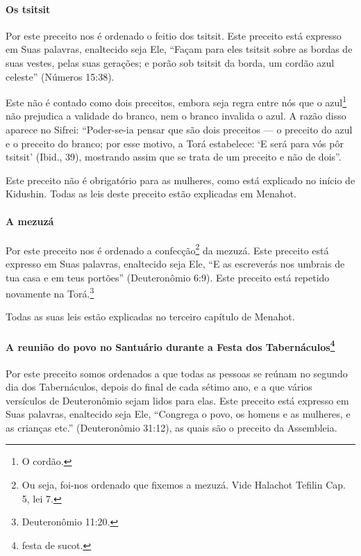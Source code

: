 \paragraph{Os tsitsit}

Por este preceito nos é ordenado o feitio dos tsitsit. Este
preceito está expresso em Suas palavras, enaltecido seja Ele, ``Façam
para eles tsitsit sobre as bordas de suas vestes, pelas suas gerações;
e porão sob tsitsit da borda, um cordão azul celeste'' (Números
15:38).

Este não é contado como dois preceitos, embora seja regra entre nós que
o azul\footnote{O cordão.} não prejudica a validade do
branco, nem o branco invalida
o azul. A razão disso aparece no Sifrei:
``Poder-se-ia pensar que são dois preceitos --- o preceito do azul e o
preceito do branco; por esse motivo, a Torá estabelece: `E será para
vós pôr tsitsit' (Ibid., 39), mostrando assim que se trata de um
preceito e não de dois''.

Este preceito não é obrigatório para as mulheres, como está explicado no
início de Kidushin. Todas as leis deste preceito estão explicadas em
Menahot.

\paragraph{A mezuzá}

Por este preceito nos é ordenado a confecção\footnote{Ou seja, foi-nos ordenado que fixemos a mezuzá. Vide Halachot Tefilin Cap. 5, lei 7.} da
mezuzá. Este
preceito está expresso em Suas palavras, enaltecido seja Ele, ``E as
escreverás
nos umbrais de tua casa e em teus portões'' (Deuteronômio 6:9). Este
preceito está repetido novamente na Torá.\footnote{Deuteronômio 11:20.}

Todas as suas leis estão explicadas no terceiro capítulo de Menahot.

\paragraph{A reunião do povo no Santuário durante a Festa dos
Tabernáculos\protect\footnote{festa de sucot.}}

Por este preceito somos ordenados a que todas as pessoas se reúnam no
segundo dia dos Tabernáculos, depois do final de cada sétimo ano, e a
que vários versículos de Deuteronômio sejam lidos para elas. Este
preceito está expresso em Suas palavras, enaltecido seja Ele, ``Congrega
o povo, os homens e as mulheres, e as crianças etc.'' (Deuteronômio
31:12), as quais são o preceito da Assembleia.

